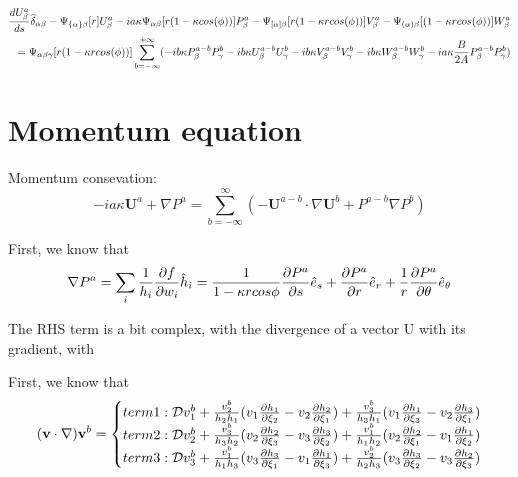 \documentclass{Note}
\begin{document}
\begin{equation}
\begin{aligned}
{d U_\beta^a \over d s}\widehat{\delta }_{\alpha\beta}-\Psi_{\{\alpha\}\beta}[r]U_\beta^a-ia \kappa \Psi_{\alpha\beta}[r(1-\kappa cos(\phi))] P_\beta^a -\Psi_{[\alpha]\beta}[ r(1-\kappa r cos(\phi))]V_\beta^a-\Psi_{(\alpha)\beta}[ (1-\kappa r cos(\phi))]W_\beta^a\\
=\Psi_{\alpha\beta\gamma}[r(1-\kappa r cos(\phi))] \sum_{b=-\infty}^{+\infty}(-ib\kappa P_\beta^{a-b} P_\gamma^{b}-ib\kappa U_\beta^{a-b} U_\gamma^{b}-ib\kappa V_\beta^{a-b} V_\gamma^{b}-ib\kappa  W_\beta^{a-b} W_\gamma^{b}-ia\kappa  {B\over {2A}}P_\beta^{a-b}P_\gamma^{b})\\
\end{aligned}
\end{equation}

\section{Momentum equation}


Momentum consevation:
\begin{equation}
-ia\kappa \textbf{U}^a+\nabla P^a=\sum_{b=-\infty}^{\infty}(-\textbf{U}^{a-b}\cdot \nabla \textbf{U}^b+P^{a-b}\nabla P^b)
\end{equation}

First, we know that
\begin{equation}
\begin{aligned}
\nabla P^a=\sum_i{1\over h_i}{\partial f\over {\partial  w_i}}\hat{h}_i={1\over {1-\kappa rcos\phi}}{\partial P^a\over {\partial s}}\hat{e}_s+{\partial P^a\over {\partial r}}\hat{e}_r+{1\over r}{\partial P^a\over {\partial \theta}}\hat{e}_\theta
\end{aligned}
\end{equation}

The RHS term is a bit complex, with the divergence of a vector U with its gradient, with

First, we know that
\begin{equation}
\begin{aligned}
(\textbf{v}\cdot \nabla )\textbf{v}^b=
\left\{\begin{matrix}
term1:\mathcal{D}v_1^b+{v_2^b\over{h_2h_1}}(v_1{{\partial h_1}\over {\partial \xi_2}}-v_2{{\partial h_2}\over {\partial \xi_1}})+{v_3^b\over{h_3h_1}}(v_1{{\partial h_1}\over {\partial \xi_3}}-v_2{{\partial h_3}\over {\partial \xi_1}})\\
term2:\mathcal{D}v_2^b+{v_3^b\over{h_3h_2}}(v_2{{\partial h_2}\over {\partial \xi_3}}-v_3{{\partial h_3}\over {\partial \xi_2}})+{v_1^b\over{h_1h_2}}(v_2{{\partial h_2}\over {\partial \xi_1}}-v_1{{\partial h_1}\over {\partial \xi_2}})\\
term3:\mathcal{D}v_3^b+{v_1^b\over{h_1h_3}}(v_3{{\partial h_3}\over {\partial \xi_1}}-v_1{{\partial h_1}\over {\partial \xi_3}})+{v_2^b\over{h_2h_3}}(v_3{{\partial h_3}\over {\partial \xi_2}}-v_3{{\partial h_2}\over {\partial \xi_3}})\\
\end{matrix}\right.
\end{aligned}
\end{equation}
\end{document}
